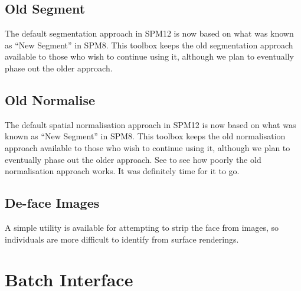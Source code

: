 \documentclass[a4paper,titlepage,openany]{article}
\begin{document}
\begin{multicols}{2}
\subsection{Old Segment}
The default segmentation approach in SPM12 is now based on what was known as ``New Segment'' in SPM8.
This toolbox keeps the old segmentation approach available to those who wish to continue using it, although we plan to eventually phase out the older approach.

\subsection{Old Normalise}
The default spatial normalisation approach in SPM12 is now based on what was known as ``New Segment'' in SPM8.
This toolbox keeps the old normalisation approach available to those who wish to continue using it, although we plan to eventually phase out the older approach.
See \cite{klein_evaluation} to see how poorly the old normalisation approach works.
It was definitely time for it to go.

\subsection{De-face Images}
A simple utility is available for attempting to strip the face from images, so individuals are more difficult to identify from surface renderings.

\section{Batch Interface}




\end{multicols}
\end{document}
